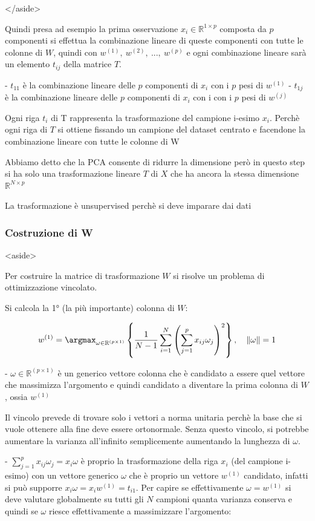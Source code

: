 </aside>

Quindi presa ad esempio la prima osservazione $x_i\in\mathbb{R}^{1\times p}$ composta da $p$ componenti si effettua la combinazione lineare di queste componenti con tutte le colonne di $W$, quindi con $w^{(1)},\ w^{(2)},\ ...,\ w^{(p)}$ e ogni combinazione lineare sarà un elemento $t_{ij}$ della matrice $T$.

- $t_{11}$ è la combinazione lineare delle $p$ componenti di $x_i$ con i $p$ pesi di $w^{(1)}$
- $t_{1j}$ è la combinazione lineare delle $p$ componenti di $x_i$ con i con i $p$ pesi di $w^{(j)}$

Ogni riga $t_i$ di T rappresenta la trasformazione del campione i-esimo $x_i$. Perchè ogni riga di $T$ si ottiene fissando un campione del dataset centrato e facendone la combinazione lineare con tutte le colonne di W

Abbiamo detto che la PCA consente di ridurre la dimensione però in questo step si ha solo una trasformazione lineare $T$ di $X$ che ha ancora la stessa dimensione $\mathbb{R}^{N\times p}$

La trasformazione è unsupervised perchè si deve imparare dai dati

\subsubsection{Costruzione di W}

<aside>


Per costruire la matrice di trasformazione $W$ si risolve un problema di ottimizzazione vincolato.

Si calcola la 1° (la più importante) colonna di $W$:

$$
w^{(1)} = \argmax_{\omega\in \mathbb{R}^{(p\times1)}} \left\{ \frac{1}{N-1} \sum_{i=1}^{N} \left( \sum_{j=1}^{p} x_{ij} \omega_j \right)^2 \right\},\quad \|\omega\|=1
$$

- $\omega\in \mathbb{R}^{(p\times1)}$ è un generico vettore colonna che è candidato a essere quel vettore che massimizza l’argomento e quindi candidato a diventare la prima colonna di $W$, ossia $w^{(1)}$

Il vincolo prevede di trovare solo i vettori a norma unitaria perchè la base che si vuole ottenere alla fine deve essere ortonormale. Senza questo vincolo, si potrebbe aumentare la varianza all'infinito semplicemente aumentando la lunghezza di $\omega$.

- $\sum_{j=1}^{p} x_{ij}\omega_j = x_i\omega$ è proprio la trasformazione della riga $x_i$ (del campione i-esimo) con un vettore generico $\omega$ che è proprio un vettore $w^{(1)}$ candidato, infatti si può supporre $x_i\omega=x_iw^{(1)}=t_{i1}$.
Per capire se effettivamente $\omega=w^{(1)}$ si deve valutare globalmente su tutti gli $N$ campioni quanta varianza conserva e quindi se $\omega$ riesce effettivamente a massimizzare l’argomento:

